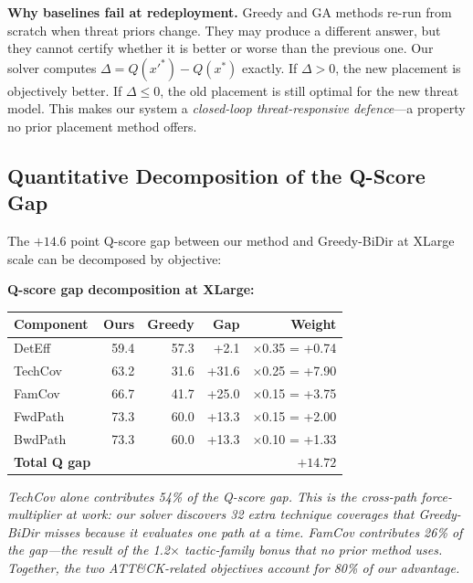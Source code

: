 \documentclass[journal]{IEEEtran}
\begin{document}
\begin{insightbox}
\textbf{Why baselines fail at redeployment.}
Greedy and GA methods re-run from scratch when threat
priors change.
They may produce a different answer, but they cannot
certify whether it is better or worse than the previous one.
Our solver computes $\Delta=Q(x'^*)-Q(x^*)$ exactly.
If $\Delta>0$, the new placement is objectively better.
If $\Delta\leq0$, the old placement is still optimal
for the new threat model.
This makes our system a \emph{closed-loop threat-responsive
defence}---a property no prior placement method offers.
\end{insightbox}

\subsection{Quantitative Decomposition of the Q-Score Gap}

The $+14.6$ point Q-score gap between our method and
Greedy-BiDir at XLarge scale can be decomposed by
objective:

\begin{examplebox}
\textbf{Q-score gap decomposition at XLarge:}
\begin{center}
\small
\renewcommand{\arraystretch}{1.15}
\begin{tabular}{@{}lrrrr@{}}
\toprule
\textbf{Component}&\textbf{Ours}&\textbf{Greedy}&\textbf{Gap}&\textbf{Weight}\\
\midrule
DetEff&59.4&57.3&+2.1&$\times$0.35 = +0.74\\
TechCov&63.2&31.6&+31.6&$\times$0.25 = +7.90\\
FamCov&66.7&41.7&+25.0&$\times$0.15 = +3.75\\
FwdPath&73.3&60.0&+13.3&$\times$0.15 = +2.00\\
BwdPath&73.3&60.0&+13.3&$\times$0.10 = +1.33\\
\midrule
\textbf{Total Q gap}&&&&$\mathbf{+14.72}$\\
\bottomrule
\end{tabular}
\end{center}
\textit{TechCov alone contributes 54\% of the Q-score gap.
This is the cross-path force-multiplier at work: our solver
discovers 32 extra technique coverages that Greedy-BiDir
misses because it evaluates one path at a time.
FamCov contributes 26\% of the gap---the result of the
1.2$\times$ tactic-family bonus that no prior method uses.
Together, the two ATT\&CK-related objectives account for
80\% of our advantage.}
\end{examplebox}
\end{document}
